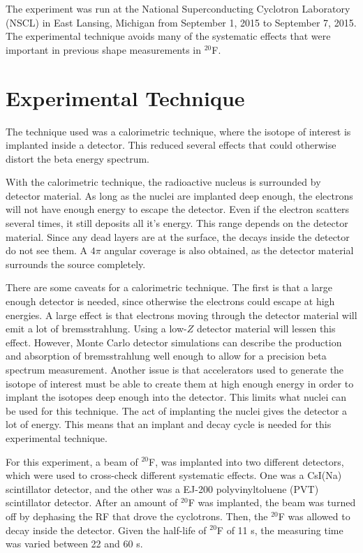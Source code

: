 \documentclass[../MaxHughesThesis.tex]{subfiles}
\begin{document}
The experiment was run at the National Superconducting Cyclotron Laboratory (NSCL) in East Lansing, Michigan from September 1, 2015 to September 7, 2015.
The experimental technique avoids many of the systematic effects that were important in previous shape measurements in  $^{20}$F.

\section{Experimental Technique}
The technique used was a calorimetric technique, where the isotope of interest is implanted inside a detector.
This reduced several effects that could otherwise distort the beta energy spectrum.

With the calorimetric technique, the radioactive nucleus is surrounded by detector material.
As long as the nuclei are implanted deep enough, the electrons will not have enough energy to escape the detector.
Even if the electron scatters several times, it still deposits all it's energy.
This range depends on the detector material.
Since any dead layers are at the surface, the decays inside the detector do not see them.
A $4\pi$ angular coverage is also obtained, as the detector material surrounds the source completely.

There are some caveats for a calorimetric technique. 
The first is that a large enough detector is needed, since otherwise the electrons could escape at high energies.
A large effect is that electrons moving through the detector material will emit a lot of bremsstrahlung.
Using a low-$Z$ detector material will lessen this effect.
However, Monte Carlo detector simulations can describe the production and absorption of bremsstrahlung well enough to allow for a precision beta spectrum measurement. 
Another issue is that accelerators used to generate the isotope of interest must be able to create them at high enough energy in order to implant the isotopes deep enough into the detector.
This limits what nuclei can be used for this technique.
The act of implanting the nuclei gives the detector a lot of energy. 
This means that an implant and decay cycle is needed for this experimental technique.

For this experiment, a  beam of  $^{20}$F, was implanted into two different detectors, which were used to cross-check different systematic effects.
One was a CsI(Na) scintillator detector, and the other was a  EJ-200 polyvinyltoluene (PVT) scintillator detector. 
After an amount of $^{20}$F was implanted, the beam was turned off by dephasing the RF that drove the cyclotrons.
Then, the $^{20}$F was allowed to decay inside the detector. 
Given the half-life of $^{20}$F of 11 s, the measuring time was varied between 22 and 60 s.
\end{document}

